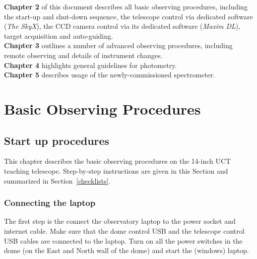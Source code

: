 \documentclass[12pt,twoside,a4paper]{report}
\begin{document}
\textbf{Chapter 2} of this document describes all basic observing procedures, including the start-up and shut-down sequence,
the telescope control via dedicated software (\emph{The SkyX}), the CCD camera control via its dedicated
software (\emph{Maxim DL}), target acquisition and auto-guiding.\\

\textbf{Chapter 3} outlines a number of advanced observing procedures, including remote observing and details of 
instrument changes.\\

\textbf{Chapter 4} highlights general guidelines for photometry.\\

\textbf{Chapter 5} describes usage of the newly-commissioned spectrometer.\\

\vfill \eject





\chapter{Basic Observing Procedures}

\section{Start up procedures}

This chapter describes the basic observing procedures on the 14-inch UCT teaching telescope. 
Step-by-step instructions are given in this Section and
summarized in Section~\ref{checklists}.

\subsection{Connecting the laptop}

The first step is the connect the observatory laptop to the power socket and internet cable. Make
sure that the dome control USB and the telescope control USB cables are connected to the laptop.
Turn on all the power switches in the dome (on the East and North wall of the dome) and start the
(windows) laptop.
\end{document}
